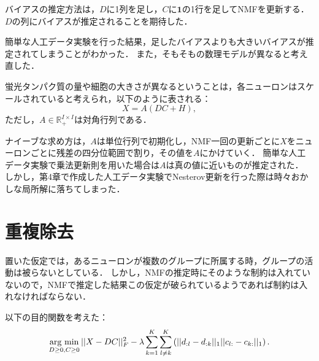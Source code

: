 バイアスの推定方法は，$D$に1列を足し，$C$に$\mathbf 1$の1行を足してNMFを更新する．
$D$の列にバイアスが推定されることを期待した．

簡単な人工データ実験を行った結果，足したバイアスよりも大きいバイアスが推定されてしまうことがわかった．
また，そもそもの数理モデルが異なると考え直した．

蛍光タンパク質の量や細胞の大きさが異なるということは，各ニューロンはスケールされていると考えられ，以下のように表される：
\begin{equation}
	X = A(DC + H),
\end{equation}
ただし，$A \in \mathbb{R}_+^{I \times I}$は対角行列である．

ナイーブな求め方は，$A$は単位行列で初期化し，NMF一回の更新ごとに$X$をニューロンごとに残差の四分位範囲で割り，その値を$A$にかけていく．
簡単な人工データ実験で乗法更新則を用いた場合は$A$は真の値に近いものが推定された．
しかし，第4章で作成した人工データ実験でNesterov更新を行った際は時々おかしな局所解に落ちてしまった．

\section{重複除去}
置いた仮定では，あるニューロンが複数のグループに所属する時，グループの活動は被らないとしている．
しかし，NMFの推定時にそのような制約は入れていないので，NMFで推定した結果この仮定が破られているようであれば制約は入れなければならない．

以下の目的関数を考えた：
\begin{align}
	\mathop{\textrm{arg~min}}\limits_{D \geq 0, C \geq 0} ||X - DC||_F^2 - \lambda \sum_{k=1}^K \sum_{l \neq k}^K \left( || d_{:l} - d_{:k} ||_1 || c_{l:} - c_{k:} ||_1 \right).
  \label{eq:overlap}
\end{align}

